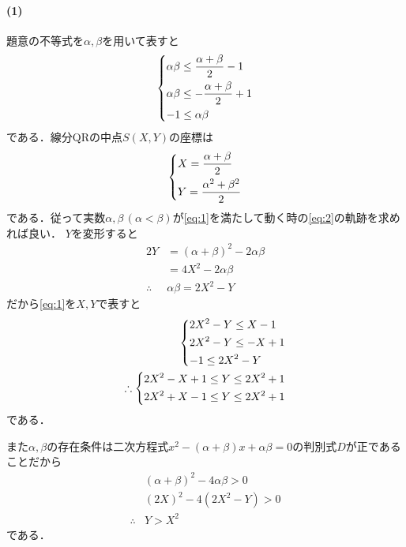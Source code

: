 \documentclass[../../main.tex]{subfiles}
\begin{document}
\paragraph{(1)}

題意の不等式を$\alpha,\beta$を用いて表すと
\begin{align}
  \begin{dcases}
    \alpha\beta \le \dfrac{\alpha+\beta}{2} - 1 \\
    \alpha\beta \le -\dfrac{\alpha+\beta}{2} + 1 \\
    -1 \le \alpha\beta
  \end{dcases} \label{eq:1}
\end{align}
である．線分QRの中点$S(X,Y)$の座標は
\begin{align}
  \begin{dcases}
    X = \dfrac{\alpha+\beta}{2} \\
    Y = \dfrac{\alpha^2+\beta^2}{2}
  \end{dcases} \label{eq:2}
\end{align}
である．従って実数$\alpha,\beta\, (\alpha<\beta)$が\cref{eq:1}を満たして動く時の\cref{eq:2}の軌跡を求めれば良い．
$Y$を変形すると
\begin{align}
  2Y
  &= \left(\alpha+\beta\right)^2 - 2\alpha\beta \\
  &= 4X^2 - 2\alpha\beta \\
  \therefore
  & \alpha\beta = 2X^2 - Y \label{eq:3}
\end{align}
だから\cref{eq:1}を$X,Y$で表すと
\begin{align}
  \begin{dcases}
    2X^2 - Y \le X - 1 \\
    2X^2 - Y \le -X + 1 \\
    -1 \le 2X^2 - Y
  \end{dcases} \\
  \therefore
  \begin{dcases}
    2X^2 - X + 1 \le Y \le 2X^2+1 \\
    2X^2 + X - 1 \le Y \le 2X^2+1
  \end{dcases} \label{eq:4}
\end{align}
である．

また$\alpha,\beta$の存在条件は二次方程式$x^2-(\alpha+\beta)x+\alpha\beta=0$の判別式$D$が正であることだから
\begin{align}
  &(\alpha+\beta)^2 - 4\alpha\beta > 0 \\
  &(2X)^2 - 4(2X^2 - Y) > 0 \\
  \therefore
  &Y>X^2 \label{eq:5}
\end{align}
である．
\end{document}
